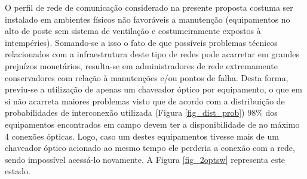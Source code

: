 O perfil de rede de comunicação considerado na presente proposta costuma ser instalado em ambientes físicos não favoráveis a manutenção (equipamentos no alto de poste sem sistema de ventilação e costumeiramente expostos à intempéries). Somando-se a isso o fato de que possíveis problemas técnicos relacionados com a infraestrutura deste tipo de redes pode acarretar em grandes prejuízos monetários, resulta-se em administradores de rede extremamente conservadores com relação à manutenções e/ou pontos de falha. Desta forma, previu-se a utilização de apenas um chaveador óptico por equipamento, o que em si não acarreta maiores problemas visto que de acordo com a distribuição de probabilidades de interconexão utilizada (Figura \ref{fig_dist_prob}) 98\% dos equipamentos encontrados em campo devem ter a disponibilidade de no máximo 4 conexões ópticas. Logo, caso um destes equipamentos tivesse mais de um chaveador óptico acionado ao mesmo tempo ele perderia a conexão com a rede, sendo impossível acessá-lo novamente. A Figura \ref{fig_2optsw} representa este estado.

